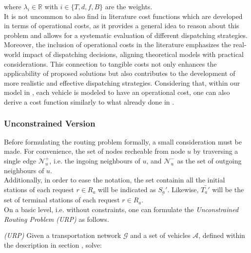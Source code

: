 where $\lambda_i \in \mathbb{R}$ with $i \in \{T, d,f, B\}$ are the weights.\\
It is not uncommon to also find in literature cost functions which are developed in terms of operational costs, as it provides a general idea to reason about this problem and allows for a systematic evaluation of different dispatching strategies. Moreover, the inclusion of operational costs in the literature emphasizes the real-world impact of dispatching decisions, aligning theoretical models with practical considerations. This connection to tangible costs not only enhances the applicability of proposed solutions but also contributes to the development of more realistic and effective dispatching strategies. Considering that, within our model in , each vehicle is modeled to have an operational cost, one can also derive a cost function similarly to what already done in \cite{project_thesis}. 
\subsubsection*{Unconstrained Version}
Before formulating the routing problem formally, a small consideration must be made. For convenience, the set of nodes recheable from node $u$ by traversing a single edge $\mathcal{N}^+_u$, i.e. the ingoing neighbours of $u$, and $\mathcal{N}^-_u$ as the set of outgoing neighbours of $u$.\\ Additionally, in order to ease the notation, the set containin all the initial stations of each request $r \in R_a$ will be indicated as $\underline{S_a'}$. Likewise,  $\bar{T_a'}$ will be the set of terminal stations of each request $r \in R_a$. \\
On a basic level, i.e. without constraints, one can formulate the \textit{Unconstrained Routing Problem (URP)} as follows. \\
\begin{algori}{\textit{(URP)}}
	Given a transportation network $\mathcal{G}$ and a set of vehicles $\mathcal{A}$, defined within the description in section , solve:
\end{algori}


